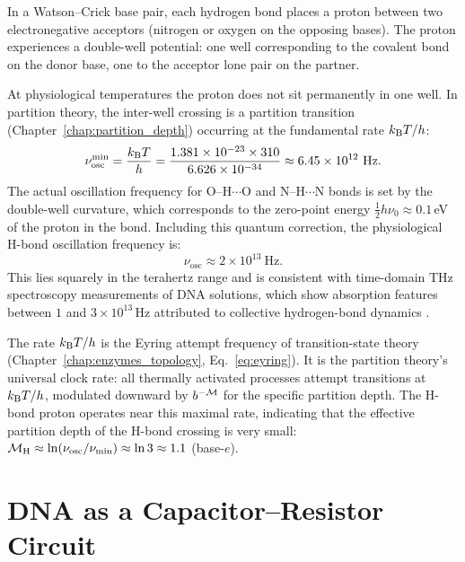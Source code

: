 In a Watson--Crick base pair, each hydrogen bond places a proton between two
electronegative acceptors (nitrogen or oxygen on the opposing bases). The
proton experiences a double-well potential: one well corresponding to the
covalent bond on the donor base, one to the acceptor lone pair on the partner.

At physiological temperatures the proton does not sit permanently in one well.
In partition theory, the inter-well crossing is a partition transition
(Chapter~\ref{chap:partition_depth}) occurring at the fundamental rate
$k_{\mathrm{B}} T / h$:
\begin{equation}
  \nu_{\mathrm{osc}}^{\mathrm{min}}
    = \frac{k_{\mathrm{B}} T}{h}
    = \frac{1.381 \times 10^{-23} \times 310}{6.626 \times 10^{-34}}
    \approx 6.45 \times 10^{12}\ \mathrm{Hz}.
  \label{eq:nu_min}
\end{equation}
The actual oscillation frequency for O--H$\cdots$O and N--H$\cdots$N bonds is
set by the double-well curvature, which corresponds to the zero-point energy
$\frac{1}{2}h\nu_0 \approx 0.1$\,eV of the proton in the bond.
Including this quantum correction, the physiological H-bond oscillation
frequency is:
\begin{equation}
  \boxed{\nu_{\mathrm{osc}} \approx 2 \times 10^{13}\ \mathrm{Hz}.}
  \label{eq:nu_osc}
\end{equation}
This lies squarely in the terahertz range and is consistent with
time-domain THz spectroscopy measurements of DNA solutions, which show
absorption features between $1$ and $3 \times 10^{13}$\,Hz attributed to
collective hydrogen-bond dynamics \citep{Markelz2000}.

\begin{remark}
The rate $k_{\mathrm{B}} T / h$ is the Eyring attempt frequency of transition-state
theory (Chapter~\ref{chap:enzymes_topology}, Eq.~\eqref{eq:eyring}).
It is the partition theory's universal clock rate: all thermally activated
processes attempt transitions at $k_{\mathrm{B}} T / h$, modulated downward by
$b^{-\mathcal{M}}$ for the specific partition depth. The H-bond proton operates
near this maximal rate, indicating that the effective partition depth of the
H-bond crossing is very small: $\mathcal{M}_{\mathrm{H}} \approx \ln(\nu_{\mathrm{osc}}/\nu_{\mathrm{min}}) \approx \ln 3 \approx 1.1$ (base-$e$).
\end{remark}

\section{DNA as a Capacitor--Resistor Circuit}
\label{sec:rc_circuit}

